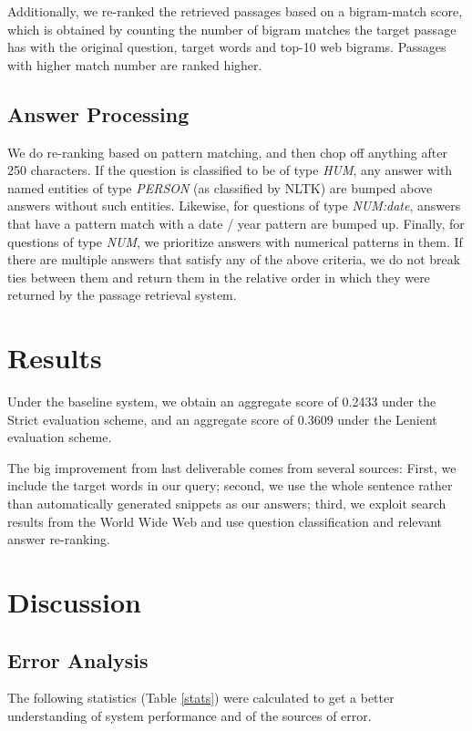 \documentclass[11pt]{article}
\begin{document}
Additionally, we re-ranked the retrieved passages based on a bigram-match score, which is obtained by counting the number of bigram matches the target passage has with the original question, target words and  top-10 web bigrams. Passages with higher match number are ranked higher.

\subsection{Answer Processing}
We do re-ranking based on pattern matching, and then chop off anything after 250 characters. If the question is classified to be of type \emph{HUM}, any answer with named entities of type \emph{PERSON} (as classified by NLTK) are bumped above answers without such entities. Likewise, for questions of type \emph{NUM:date}, answers that have a pattern match with a date / year pattern are bumped up. Finally, for questions of type \emph{NUM}, we prioritize answers with numerical patterns in them. If there are multiple answers that satisfy any of the above criteria, we do not break ties between them and return them in the relative order in which they were returned by the passage retrieval system.

\section{Results}

Under the baseline system, we obtain an aggregate score of 0.2433 under the Strict evaluation scheme, and an aggregate score of 0.3609 under the Lenient evaluation scheme.

The big improvement from last deliverable comes from several sources: First, we include the target words in our query; second, we use the whole sentence rather than automatically generated snippets as our answers; third, we exploit search results from the World Wide Web and use question classification and relevant answer re-ranking.

\section{Discussion}
\label{sec:discussion}

\subsection{Error Analysis}
The following statistics (Table \ref{stats}) were calculated to get a better understanding of system performance and of the sources of error. 
\end{document}
